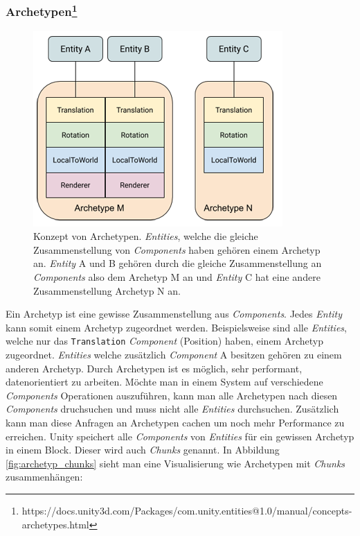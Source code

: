 \subsubsection{Archetypen\footnote{https://docs.unity3d.com/Packages/com.unity.entities@1.0/manual/concepts-archetypes.html}}
\begin{figure}[H]
\begin{center}
\includegraphics[scale=0.7]{Bilder/ArchetypeConcept.png}
\caption{Konzept von Archetypen. \textit{Entities}, welche die gleiche Zusammenstellung von \textit{Components} haben gehören einem Archetyp an. \textit{Entity} A und B gehören durch die gleiche Zusammenstellung an \textit{Components} also dem Archetyp M an und \textit{Entity} C hat eine andere Zusammenstellung Archetyp N an.}
\label{fig:archetype_concept}
\end{center}
\end{figure}
Ein Archetyp ist eine gewisse Zusammenstellung aus \textit{Components}. Jedes \textit{Entity} kann somit einem Archetyp zugeordnet werden. Beispielsweise sind alle \textit{Entities}, welche nur das \texttt{Translation} \textit{Component} (Position) haben, einem Archetyp zugeordnet. \textit{Entities} welche zusätzlich \textit{Component} A besitzen gehören zu einem anderen Archetyp. Durch Archetypen ist es möglich, sehr performant, datenorientiert zu arbeiten. Möchte man in einem System auf verschiedene \textit{Components} Operationen auszuführen, kann man alle Archetypen nach diesen \textit{Components} druchsuchen und muss nicht alle \textit{Entities} durchsuchen. Zusätzlich kann man diese Anfragen an Archetypen cachen um noch mehr Performance zu erreichen. Unity speichert alle \textit{Components} von \textit{Entities} für ein gewissen Archetyp in einem Block. Dieser wird auch \textit{Chunks} genannt. In Abbildung \ref{fig:archetyp_chunks} sieht man eine Visualisierung wie Archetypen mit \textit{Chunks} zusammenhängen:
